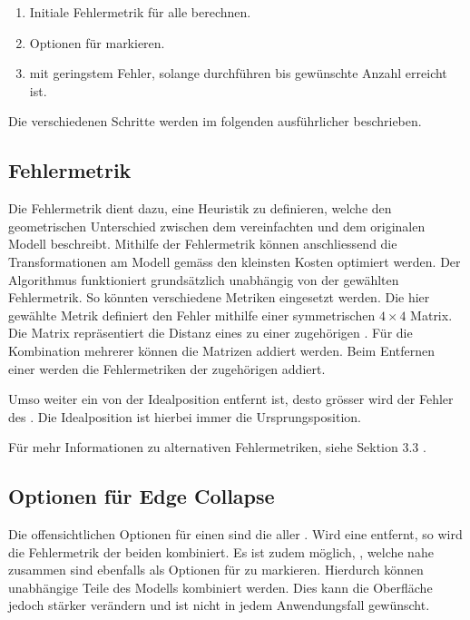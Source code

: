 \begin{enumerate}
  \item Initiale Fehlermetrik für alle  berechnen.
  \item Optionen für  markieren.
  \item {} mit geringstem Fehler, solange durchführen bis gewünschte Anzahl  erreicht ist.
\end{enumerate}

Die verschiedenen Schritte werden im folgenden ausführlicher beschrieben.

\subsection{Fehlermetrik}
Die Fehlermetrik dient dazu, eine Heuristik zu definieren, welche den geometrischen Unterschied zwischen dem vereinfachten und dem originalen Modell beschreibt.
Mithilfe der Fehlermetrik können anschliessend die Transformationen am Modell gemäss den kleinsten Kosten optimiert werden. Der Algorithmus funktioniert grundsätzlich unabhängig von der gewählten Fehlermetrik. So könnten verschiedene Metriken eingesetzt werden.
Die hier gewählte Metrik definiert den Fehler mithilfe einer symmetrischen $4\times 4$ Matrix. Die Matrix repräsentiert die Distanz eines  zu einer zugehörigen . Für die Kombination mehrerer  können die Matrizen addiert werden. Beim Entfernen einer  werden die Fehlermetriken der zugehörigen  addiert.

Umso weiter ein  von der Idealposition entfernt ist, desto grösser wird der Fehler des . Die Idealposition ist hierbei immer die Ursprungsposition.

Für mehr Informationen zu alternativen Fehlermetriken, siehe  Sektion 3.3 \cite{quadridBasedSurfaceSimplification}.

\subsection{Optionen für Edge Collapse}

Die offensichtlichen Optionen für einen  sind die  aller . Wird eine  entfernt, so wird die Fehlermetrik der beiden  kombiniert.
Es ist zudem möglich, , welche nahe zusammen sind ebenfalls als Optionen für  zu markieren. Hierdurch können unabhängige Teile des Modells kombiniert werden. Dies kann die Oberfläche jedoch stärker verändern und ist nicht in jedem Anwendungsfall gewünscht.

